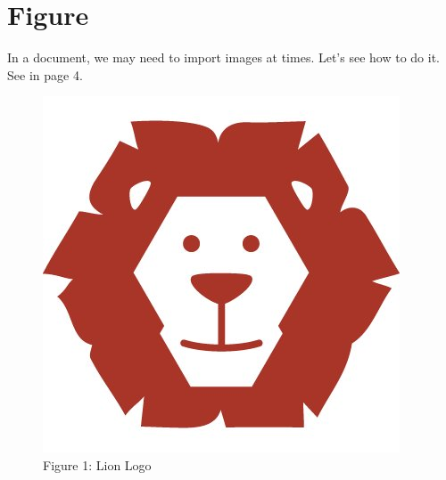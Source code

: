 \documentclass[12pt, a4paper]{article} %
\begin{document}
	\section{Figure}
	In a document, we may need to import images at times. Let’s see how to do it.\\
	See in page 4.
	
	\begin{figure}[h!]
		\centering
		\includegraphics[scale=0.9]{lion.jpg}
		\caption{Figure 1: Lion Logo
		}
	\end{figure}
	
	
\end{document}
